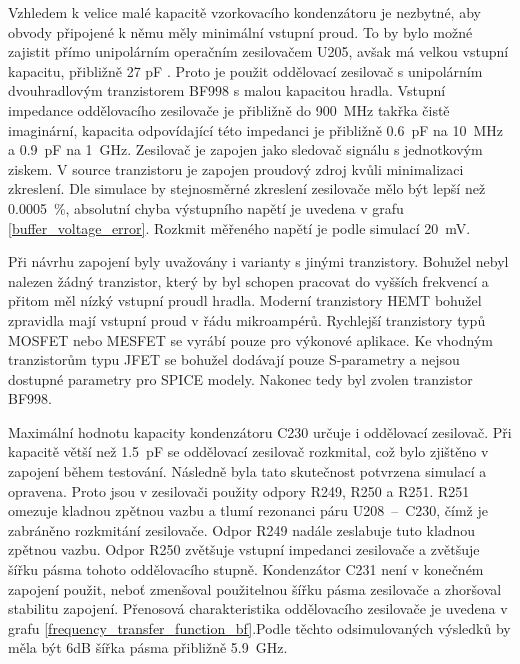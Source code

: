 Vzhledem k velice malé kapacitě vzorkovacího kondenzátoru je nezbytné, aby obvody připojené k němu měly minimální vstupní proud. To by bylo možné zajistit přímo unipolárním operačním zesilovačem U205, avšak má velkou vstupní kapacitu, přibližně 27 pF \cite{oscilloscopefrontend}. Proto je použit oddělovací zesilovač s unipolárním dvouhradlovým tranzistorem BF998 s malou kapacitou hradla. Vstupní impedance oddělovacího zesilovače je přibližně do \SI{900}{\mega\hertz} takřka čistě imaginární, kapacita odpovídající této impedanci je přibližně \SI{0.6}{\pico\farad} na \SI{10}{\mega\hertz} a \SI{0.9}{\pico\farad} na \SI{1}{\giga\hertz}. Zesilovač je zapojen jako sledovač signálu s jednotkovým ziskem. V source tranzistoru je zapojen proudový zdroj kvůli minimalizaci zkreslení. Dle simulace by stejnosměrné zkreslení zesilovače mělo být lepší než \SI{0.0005}{\%}, absolutní chyba výstupního napětí je uvedena v grafu \ref{buffer_voltage_error}. Rozkmit měřeného napětí je podle simulací \SI{20}{\milli\volt}.

Při návrhu zapojení byly uvažovány i varianty s jinými tranzistory. Bohužel nebyl nalezen žádný tranzistor, který by byl  schopen pracovat do vyšších frekvencí a přitom měl nízký vstupní proudl hradla. Moderní tranzistory HEMT bohužel zpravidla mají vstupní proud v řádu mikroampérů. Rychlejší tranzistory typů MOSFET nebo MESFET se vyrábí pouze pro výkonové aplikace. Ke vhodným tranzistorům typu JFET se bohužel dodávají pouze S-parametry a nejsou dostupné parametry pro SPICE modely. Nakonec tedy byl zvolen tranzistor BF998. 

Maximální hodnotu kapacity kondenzátoru C230 určuje i oddělovací zesilovač. Při kapacitě větší než \SI{1.5}{\pico\farad} se oddělovací zesilovač rozkmital, což bylo zjištěno v zapojení během testování. Následně byla tato skutečnost potvrzena simulací a opravena. Proto jsou v zesilovači použity odpory R249, R250 a R251. R251 omezuje kladnou zpětnou vazbu a tlumí rezonanci páru U208~--~C230, čímž je zabráněno rozkmitání zesilovače. Odpor R249 nadále zeslabuje tuto kladnou zpětnou vazbu. Odpor R250 zvětšuje vstupní impedanci zesilovače a zvětšuje šířku pásma tohoto oddělovacího stupně. Kondenzátor C231 není v konečném zapojení použit, neboť zmenšoval použitelnou šířku pásma zesilovače a zhoršoval stabilitu zapojení. Přenosová charakteristika oddělovacího zesilovače je uvedena v grafu \ref{frequency_transfer_function_bf}.Podle těchto odsimulovaných výsledků by měla být 6\si{\deci\bel} šířka pásma přibližně \SI{5.9}{\giga\hertz}.

